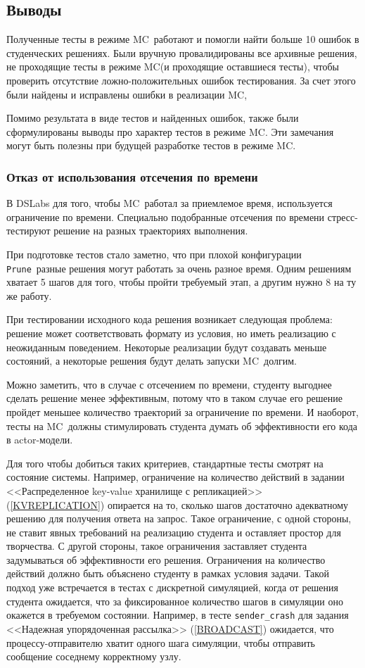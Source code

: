 \documentclass[a4paper,12pt]{extarticle}
\newcommand{\prune}[0]{\texttt{Prune}}
\newcommand{\mc}[0]{MC}
\begin{document}
\subsection{Выводы}

Полученные тесты в режиме \mc\ работают и помогли найти больше 10 ошибок в студенческих решениях.
Были вручную провалидированы все архивные решения, не проходящие тесты в режиме \mc (и проходящие оставшиеся тесты), чтобы проверить отсутствие ложно-положительных ошибок тестирования. 
За счет этого были найдены и исправлены ошибки в реализации \mc, 

Помимо результата в виде тестов и найденных ошибок, также были сформулированы выводы про характер тестов в режиме \mc.
Эти замечания могут быть полезны при будущей разработке тестов в режиме \mc. 


\subsubsection{Отказ от использования отсечения по времени}

В DSLabs \cite{b1} для того, чтобы \mc\ работал за приемлемое время, используется ограничение по времени.
Специально подобранные отсечения по времени стресс-тестируют решение на разных траекториях выполнения.

При подготовке тестов стало заметно, что при плохой конфигурации \prune\ разные решения могут работать за очень разное время.
Одним решениям хватает 5 шагов для того, чтобы пройти требуемый этап, а другим нужно 8 на ту же работу.

При тестировании исходного кода решения возникает следующая проблема: решение может соответствовать формату из условия, но иметь реализацию с неожиданным поведением.
Некоторые реализации будут создавать меньше состояний, а некоторые решения будут делать запуски \mc\ долгим.

Можно заметить, что в случае с отсечением по времени, студенту выгоднее сделать решение менее эффективным, потому что в таком случае его решение пройдет меньшее количество траекторий за ограничение по времени.
И наоборот, тесты на \mc\ должны стимулировать студента думать об эффективности его кода в actor-модели.

Для того чтобы добиться таких критериев, стандартные тесты смотрят на состояние системы.
Например, ограничение на количество действий в задании <<Распределенное key-value хранилище с репликацией>> (\cref{KVREPLICATION}) опирается на то, сколько шагов достаточно адекватному решению для получения ответа на запрос.
Такое ограничение, с одной стороны, не ставит явных требований на реализацию студента и оставляет простор для творчества.
С другой стороны, такое ограничения заставляет студента задумываться об эффективности его решения.
Ограничения на количество действий должно быть объяснено студенту в рамках условия задачи.
Такой подход уже встречается в тестах с дискретной симуляцией, когда от решения студента ожидается, что за фиксированное количество шагов в симуляции оно окажется в требуемом состоянии.
Например, в тесте \texttt{sender\_crash} для задания <<Надежная упорядоченная рассылка>>  (\cref{BROADCAST}) ожидается, что процессу-отправителю хватит одного шага симуляции, чтобы отправить сообщение соседнему корректному узлу.
\end{document}
